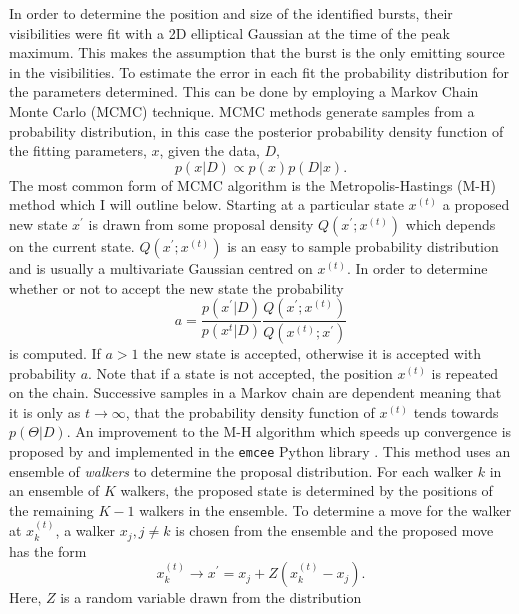 In order to determine the position and size of the identified bursts, their visibilities were fit with a 2D elliptical Gaussian at the time of the peak maximum. This makes the assumption that the burst is the only emitting source in the visibilities.
To estimate the error in each fit the probability distribution for the parameters determined. This can be done by employing a Markov Chain Monte Carlo (MCMC) technique. MCMC methods generate samples from a probability distribution, in this case the posterior probability density function of the fitting parameters, $x$, given the data, $D$,
\begin{equation}
\label{eq:pdf}
p(x \vert D) \propto p(x)p(D \vert x).
\end{equation}	
The most common form of MCMC algorithm is the Metropolis-Hastings (M-H) method which I will outline below. Starting at a particular state $x^{(t)}$ a proposed new state $x^\prime$ is drawn from some proposal density $Q(x^\prime;x^{(t)})$ which depends on the current state. $Q(x^\prime;x^{(t)})$ is an easy to sample probability distribution and is usually a multivariate Gaussian centred on $x^{(t)}$. In order to determine whether or not to accept the new state the probability
\begin{equation}
\label{eq:MHnewstate}
a = \frac{p(x^\prime \vert D)}{p(x^{t} \vert D)} \frac{Q(x^\prime;x^{(t)})}{Q(x^{(t)};x^\prime)}
\end{equation}
is computed. If $a > 1$ the new state is accepted, otherwise it is accepted with probability $a$. Note that if a state is not accepted, the position $x^{(t)}$ is repeated on the chain. Successive samples in a Markov chain are dependent meaning that it is only as $t \rightarrow \infty$, that the probability density function of $x^{(t)}$ tends towards $p(\Theta \vert D)$. An improvement to the M-H algorithm which speeds up convergence is proposed by \cite{Goodman2010} and implemented in the \texttt{emcee} Python library \citep{Foreman-Mackey2012}. This method uses an ensemble of \textit{walkers} to determine the proposal distribution. For each walker $k$ in an ensemble of $K$ walkers, the proposed state is determined by the positions of the remaining $K-1$ walkers in the ensemble. To determine a move for the walker at $x_k^{(t)}$, a walker $x_j, j \neq k$ is chosen from the ensemble and the proposed move has the form
\begin{equation}
\label{eq:MCMC_walkers}
x_k^{(t)} \rightarrow x^\prime = x_j + Z(x_k^{(t)} - x_j).
\end{equation}
Here, $Z$ is a random variable drawn from the distribution
